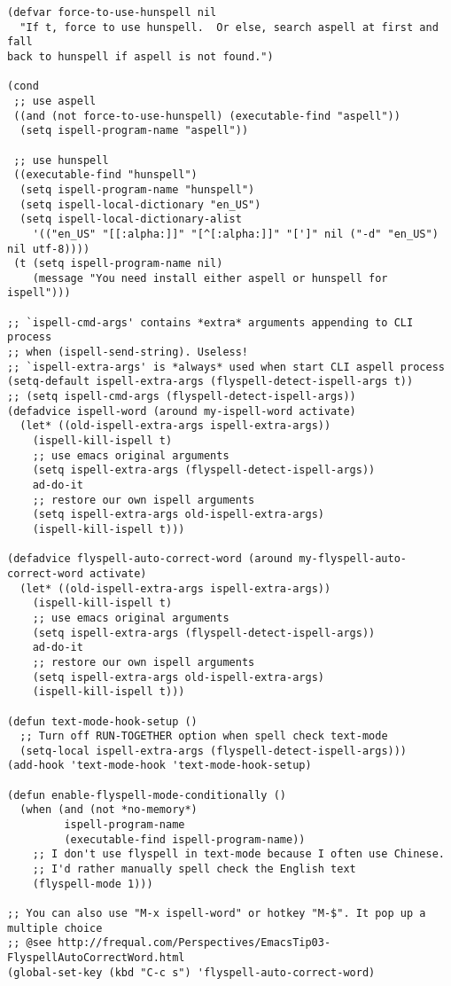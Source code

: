 \documentclass[11pt]{article}
\begin{document}
\begin{verbatim}
(defvar force-to-use-hunspell nil
  "If t, force to use hunspell.  Or else, search aspell at first and fall
back to hunspell if aspell is not found.")

(cond
 ;; use aspell
 ((and (not force-to-use-hunspell) (executable-find "aspell"))
  (setq ispell-program-name "aspell"))

 ;; use hunspell
 ((executable-find "hunspell")
  (setq ispell-program-name "hunspell")
  (setq ispell-local-dictionary "en_US")
  (setq ispell-local-dictionary-alist
	'(("en_US" "[[:alpha:]]" "[^[:alpha:]]" "[']" nil ("-d" "en_US") nil utf-8))))
 (t (setq ispell-program-name nil)
    (message "You need install either aspell or hunspell for ispell")))

;; `ispell-cmd-args' contains *extra* arguments appending to CLI process
;; when (ispell-send-string). Useless!
;; `ispell-extra-args' is *always* used when start CLI aspell process
(setq-default ispell-extra-args (flyspell-detect-ispell-args t))
;; (setq ispell-cmd-args (flyspell-detect-ispell-args))
(defadvice ispell-word (around my-ispell-word activate)
  (let* ((old-ispell-extra-args ispell-extra-args))
    (ispell-kill-ispell t)
    ;; use emacs original arguments
    (setq ispell-extra-args (flyspell-detect-ispell-args))
    ad-do-it
    ;; restore our own ispell arguments
    (setq ispell-extra-args old-ispell-extra-args)
    (ispell-kill-ispell t)))

(defadvice flyspell-auto-correct-word (around my-flyspell-auto-correct-word activate)
  (let* ((old-ispell-extra-args ispell-extra-args))
    (ispell-kill-ispell t)
    ;; use emacs original arguments
    (setq ispell-extra-args (flyspell-detect-ispell-args))
    ad-do-it
    ;; restore our own ispell arguments
    (setq ispell-extra-args old-ispell-extra-args)
    (ispell-kill-ispell t)))

(defun text-mode-hook-setup ()
  ;; Turn off RUN-TOGETHER option when spell check text-mode
  (setq-local ispell-extra-args (flyspell-detect-ispell-args)))
(add-hook 'text-mode-hook 'text-mode-hook-setup)

(defun enable-flyspell-mode-conditionally ()
  (when (and (not *no-memory*)
	     ispell-program-name
	     (executable-find ispell-program-name))
    ;; I don't use flyspell in text-mode because I often use Chinese.
    ;; I'd rather manually spell check the English text
    (flyspell-mode 1)))

;; You can also use "M-x ispell-word" or hotkey "M-$". It pop up a multiple choice
;; @see http://frequal.com/Perspectives/EmacsTip03-FlyspellAutoCorrectWord.html
(global-set-key (kbd "C-c s") 'flyspell-auto-correct-word)


\end{verbatim}
\end{document}
